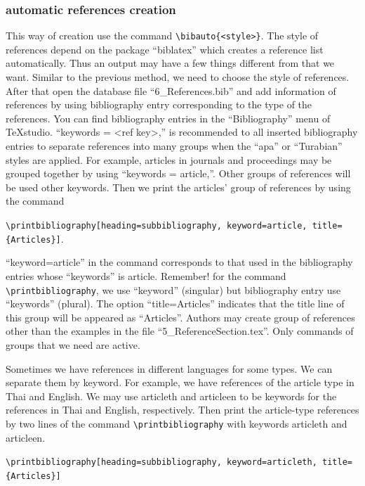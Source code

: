 \subsubsection{automatic references creation}
\subsubsectionindent This way of creation use the command \verb|\bibauto{<style>}|. The style of references depend on the package “biblatex” which creates a reference list automatically. Thus an output may have a few things different from that we want. Similar to the previous method, we need to choose the style of references. After that open the database file “6\_References.bib” and add information of references by using bibliography entry corresponding to the type of the references. You can find bibliography entries in the “Bibliography” menu of TeXstudio. “keywords = {<ref key>},” is recommended to all inserted bibliography entries to separate references into many groups when the “apa” or “Turabian” styles are applied. For example, articles in journals and proceedings may be grouped together by using “keywords = {article},”. Other groups of references will be used other keywords. Then we print the articles’ group of references by using the command \vskip2mm

\hspace*{-3cm}\verb|\printbibliography[heading=subbibliography, keyword=article, title={Articles}]|.\vskip2mm

\noindent “keyword=article” in the command corresponds to that used in the bibliography entries whose “keywords” is article. Remember! for the command \verb|\printbibliography|, we use “keyword” (singular) but bibliography entry use ``keywords'' (plural). The option  “title={Articles}” indicates that the title line of this group will be appeared as “Articles”. Authors may create group of references other than the examples in the file “5\_ReferenceSection.tex”. Only commands of groups that we need are active.

\subsubsectionindent Sometimes we have references in different languages for some types. We can separate them by keyword. For example, we have references of the article type in Thai and English. We may use articleth and articleen to be keywords for the references in Thai and English, respectively. Then print the article-type references by two lines of the command \verb|\printbibliography| with keywords articleth and articleen.

\hspace*{-3cm}\verb|\printbibliography[heading=subbibliography, keyword=articleth, title={Articles}]|

